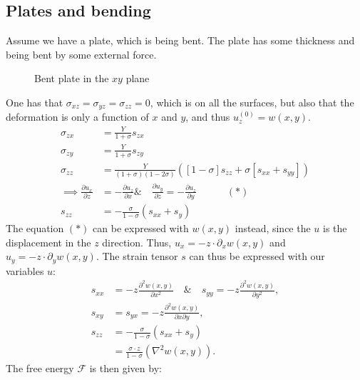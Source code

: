 \documentclass[a4paper]{article}
\newcommand{\f}{\mathcal{F}}
\begin{document}
\subsection{Plates and bending}
Assume we have a plate, which is being bent. The plate has some thickness and being bent by some external force.
\begin{figure}[H]
    \centering
    \caption{Bent plate in the $xy$ plane}
    \label{fig: bent plate}
\end{figure}\noindent
One has that $\sigma_{xz} = \sigma_{yz} = \sigma_{zz} = 0$, which is on all the surfaces, but also that the deformation is only a function of $x$ and $y$, and thus $u_z^{(0)} = w(x,y)$.
\begin{align*}
    \sigma_{zx} &= \frac{Y}{1+\sigma}s_{zx}\\
    \sigma_{zy} &= \frac{Y}{1+\sigma}s_{zy}\\
    \sigma_{zz} &= \frac{Y}{(1+\sigma)(1-2\sigma)}\left(\left[1-\sigma\right]s_{zz} + \sigma\left[s_{xx} + s_{yy}\right]\right)\\
    \implies \frac{\partial u_x}{\partial z} &= - \frac{\partial u_z}{\partial x}\&\quad \frac{\partial u_y}{\partial z} = - \frac{\partial u_z}{\partial y}\quad\quad\quad (*)\\
    s_{zz} &= -\frac{\sigma}{1-\sigma}\left(s_{xx} + s_{y}\right)
\end{align*}The equation $(*)$ can be expressed with $w(x,y)$ instead, since the $u$ is the displacement in the $z$ direction. Thus, $u_x = -z\cdot \partial_x w(x,y)$ and $u_y = -z\cdot\partial_y w(x,y)$.
The strain tensor $s$ can thus be expressed with our variables $u$:
\begin{align*}
    s_{xx} &= -z \frac{\partial^2 w(x,y)}{\partial x^2} \quad \& \quad s_{yy} = -z \frac{\partial^2 w(x,y)}{\partial y^2},\\
    s_{xy} &= s_{yx} = -z \frac{\partial^2 w(x,y)}{\partial x\partial y},\\
    s_{zz} &= -\frac{\sigma}{1-\sigma}\left(s_{xx} + s_{y}\right)\\
    &=\frac{\sigma\cdot z}{1 - \sigma}\left(\nabla^2 w(x,y)\right).
\end{align*}The free energy $\f$ is then given by:
\end{document}
